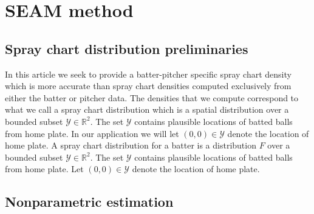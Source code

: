 \documentclass[12pt]{article}
\newcommand{\R}{\mathbb{R}}
\newcommand{\Y}{\mathcal{Y}}
\newcommand{\y}{\textbf{y}}
\begin{document}
\section{SEAM method}

\subsection{Spray chart distribution preliminaries}


In this article we seek to provide a batter-pitcher specific spray chart density which is more accurate than spray chart densities computed exclusively from either the batter or pitcher data. The densities that we compute correspond to what we call a spray chart distribution which is a spatial distribution over a bounded subset $\Y \in \R^2$. The set $\Y$ contains plausible locations of batted balls from home plate. In our application we will let $(0,0) \in \Y$ denote the location of home plate. A spray chart distribution for a batter is a distribution $F$ over a bounded subset $\Y \in \R^2$. The set $\Y$ contains plausible locations of batted balls from home plate. Let $(0,0) \in \Y$ denote the location of home plate. %


\subsection{Nonparametric estimation}
\end{document}
